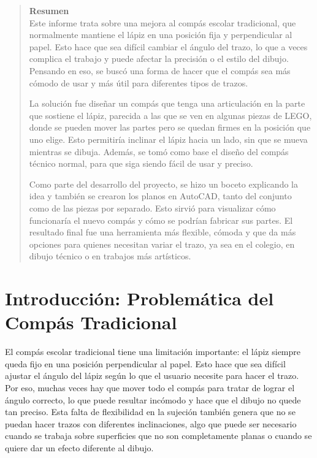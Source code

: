 \documentclass[11pt, a4paper]{article}
\begin{document}
\begin{abstract}
    \noindent \textbf{Resumen} \\
    Este informe trata sobre una mejora al compás escolar tradicional, que normalmente mantiene el lápiz en una posición fija y perpendicular al papel. Esto hace que sea difícil cambiar el ángulo del trazo, lo que a veces complica el trabajo y puede afectar la precisión o el estilo del dibujo. Pensando en eso, se buscó una forma de hacer que el compás sea más cómodo de usar y más útil para diferentes tipos de trazos.
    \smallskip

    La solución fue diseñar un compás que tenga una articulación en la parte que sostiene el lápiz, parecida a las que se ven en algunas piezas de LEGO, donde se pueden mover las partes pero se quedan firmes en la posición que uno elige. Esto permitiría inclinar el lápiz hacia un lado, sin que se mueva mientras se dibuja. Además, se tomó como base el diseño del compás técnico normal, para que siga siendo fácil de usar y preciso.
    \smallskip

    Como parte del desarrollo del proyecto, se hizo un boceto explicando la idea y también se crearon los planos en AutoCAD, tanto del conjunto como de las piezas por separado. Esto sirvió para visualizar cómo funcionaría el nuevo compás y cómo se podrían fabricar sus partes. El resultado final fue una herramienta más flexible, cómoda y que da más opciones para quienes necesitan variar el trazo, ya sea en el colegio, en dibujo técnico o en trabajos más artísticos.
\end{abstract}

\newpage
\tableofcontents
\newpage

\section{Introducción: Problemática del Compás Tradicional}
El compás escolar tradicional tiene una limitación importante: el lápiz siempre queda fijo en una posición perpendicular al papel. Esto hace que sea difícil ajustar el ángulo del lápiz según lo que el usuario necesite para hacer el trazo. Por eso, muchas veces hay que mover todo el compás para tratar de lograr el ángulo correcto, lo que puede resultar incómodo y hace que el dibujo no quede tan preciso. Esta falta de flexibilidad en la sujeción también genera que no se puedan hacer trazos con diferentes inclinaciones, algo que puede ser necesario cuando se trabaja sobre superficies que no son completamente planas o cuando se quiere dar un efecto diferente al dibujo.
\end{document}

